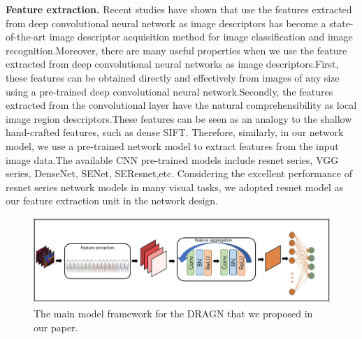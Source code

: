 \documentclass[10pt,twocolumn,letterpaper]{article}
\begin{document}
\textbf{Feature extraction.} Recent studies have shown that use the features extracted from deep convolutional neural network as image descriptors\cite{ref18} has become a state-of-the-art image descriptor acquisition method for image classification and image recognition\cite{ref16, ref19, ref20}.Moreover, there are many useful properties when we use the feature extracted from deep convolutional neural networks as image descriptors.First, these features can be obtained directly and effectively from images of any size using a pre-trained deep convolutional neural network.Secondly, the features extracted from the convolutional layer have the natural comprehensibility as local image region descriptors.These features can be seen as an analogy to the shallow hand-crafted features, such as dense SIFT\cite{ref21, ref22}. Therefore, similarly, in our network model, we use a pre-trained network model to extract features from the input image data.The available CNN pre-trained models include resnet series, VGG series, DenseNet, SENet, SEResnet,etc. Considering the excellent performance of resnet series network models in many visual tasks, we adopted resnet model as our feature extraction unit in the network design.

\begin{figure}
\begin{center}
\includegraphics[width=0.8\linewidth]{figure2.JPG}
\end{center}
   \caption{The main model framework for the DRAGN that we proposed in our paper.}
\label{fig:short}
\end{figure}
\end{document}
